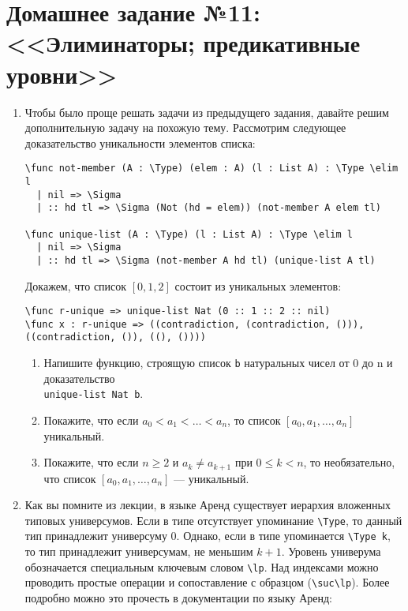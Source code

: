 \documentclass[10pt,a4paper,oneside]{article}
\begin{document}
\section*{Домашнее задание №11: <<Элиминаторы; предикативные уровни>>}
\begin{enumerate}
\item Чтобы было проще решать задачи из предыдущего задания, давайте решим дополнительную задачу
на похожую тему. Рассмотрим следующее доказательство уникальности элементов списка:
\begin{verbatim}
\func not-member (A : \Type) (elem : A) (l : List A) : \Type \elim l
  | nil => \Sigma
  | :: hd tl => \Sigma (Not (hd = elem)) (not-member A elem tl)

\func unique-list (A : \Type) (l : List A) : \Type \elim l
  | nil => \Sigma
  | :: hd tl => \Sigma (not-member A hd tl) (unique-list A tl)
\end{verbatim}

Докажем, что список $[0,1,2]$ состоит из уникальных элементов:
\begin{verbatim}
\func r-unique => unique-list Nat (0 :: 1 :: 2 :: nil)
\func x : r-unique => ((contradiction, (contradiction, ())), ((contradiction, ()), ((), ())))
\end{verbatim}

\begin{enumerate} 
\item Напишите функцию, строящую список \verb!b! натуральных чисел от 0 до n и доказательство\\ \verb!unique-list Nat b!.
\item Покажите, что если $a_0 < a_1 < \dots < a_n$, то список $[a_0,a_1,\dots,a_n]$ уникальный.
\item Покажите, что если $n \ge 2$ и $a_k \ne a_{k+1}$ при $0 \le k < n$, то необязательно, что список
$[a_0,a_1,\dots,a_n]$ --- уникальный.
\end{enumerate}

\item Как вы помните из лекции, в языке Аренд существует иерархия вложенных типовых универсумов. Если в типе отсутствует
упоминание \verb!\Type!, то данный тип принадлежит универсуму 0. Однако, если в типе упоминается \verb!\Type k!,
то тип принадлежит универсумам, не меньшим $k+1$. Уровень универума обозначается специальным ключевым словом \verb!\lp!.
Над индексами можно проводить простые операции и сопоставление с образцом (\verb!\suc\lp!). Более подробно
можно это прочесть в документации по языку Аренд:


\end{enumerate}
\end{document}
